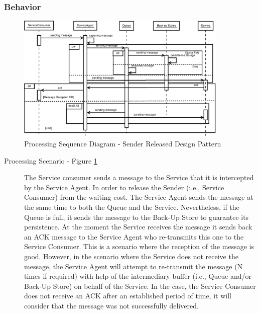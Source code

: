 \subsubsection{Behavior}

\begin{figure}
	\centering
	\includegraphics*[width=0.9\textwidth, keepaspectratio=false]{fig/image15.eps}
	\caption{Processing Sequence Diagram - Sender Released Design Pattern}
	\label{fig:seq_diagram_sender}
\end{figure}


\begin{description}
	
	\item[Processing Scenario - Figure \ref{fig:seq_diagram_sender}]
	The Service consumer sends a message to the Service that it is intercepted by the Service Agent. In order to release the Sender (i.e., Service Consumer) from the waiting cost. The Service Agent sends the message at the same time to both the Queue and the Service. Nevertheless, if the Queue is full, it sends the message to the Back-Up Store to guarantee its persistence. At the moment the Service receives the message it sends back an ACK message to the Service Agent who re-transmits this one to the Service Consumer. This is a scenario where the reception of the message is good. However, in the scenario where the Service does not receive the message, the Service Agent will attempt to re-transmit the message (N times if required) with help of the intermediary buffer (i.e., Queue and/or Back-Up Store) on behalf of the Service. In the case, the Service Consumer does not receive an ACK after an established period of time, it will consider that the message was not successfully delivered.
	
	
\end{description}

